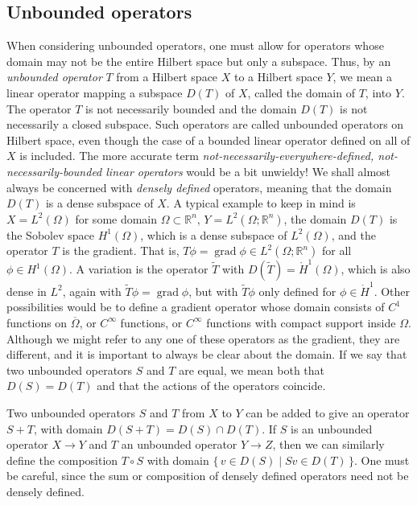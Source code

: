 \subsection{{Unbounded operators}}\label{sec:unbounded-operators}

{When considering unbounded operators, one must allow for operators whose domain may not be the entire Hilbert space but only a subspace. Thus, by an \emph{unbounded operator} $T$ from a Hilbert space $X$ to a Hilbert space $Y$, we mean a linear operator mapping a subspace $D(T)$ of $X$, called the domain of $T$, into $Y$. The operator $T$ is not necessarily bounded and the domain $D(T)$ is not necessarily a closed subspace. Such operators are called unbounded operators on Hilbert space, even though the case of a bounded linear operator defined on all of $X$ is included. The more accurate term \emph{not-necessarily-everywhere-defined, not-necessarily-bounded linear operators} would be a bit unwieldy! We shall almost always be concerned with \emph{densely defined} operators, meaning that the domain $D(T)$ is a dense subspace of $X$. A typical example to keep in mind is $X=L^2(\Omega)$ for some domain $\Omega\subset\mathbb R^n$, $Y=L^2(\Omega;\mathbb R^n)$, the domain $D(T)$ is the Sobolev space $H^1(\Omega)$, which is a dense subspace of $L^2(\Omega)$, and the operator $T$ is the gradient. That is, $T\phi=\operatorname{grad}\phi\in L^2(\Omega;\mathbb R^n)$ for all $\phi\in H^1(\Omega)$. A variation is the operator $\widetilde T$ with $D(\widetilde T)=\mathring H^1(\Omega)$, which is also dense in $L^2$, again with $\widetilde T\phi=\operatorname{grad}\phi$, but with $\widetilde T\phi$ only defined for $\phi\in\mathring H^1$. Other possibilities would be to define a gradient operator whose domain consists of $C^1$ functions on $\overline\Omega$, or $C^\infty$ functions, or $C^\infty$ functions with compact support inside $\Omega$. Although we might refer to any one of these operators as the gradient, they are different, and it is important to always be clear about the domain. If we say that two unbounded operators $S$ and $T$ are equal, we mean both that $D(S)=D(T)$ and that the actions of the operators coincide.}

{Two unbounded operators $S$ and $T$ from $X$ to $Y$ can be added to give an operator $S+T$, with domain $D(S+T)=D(S)\cap D(T)$. If $S$ is an unbounded operator $X\to Y$ and $T$ an unbounded operator $Y\to Z$, then we can similarly define the composition $T\circ S$ with domain $\{\,v\in D(S)\mid Sv\in D(T)\,\}$. One must be careful, since the sum or composition of densely defined operators need not be densely defined.}

